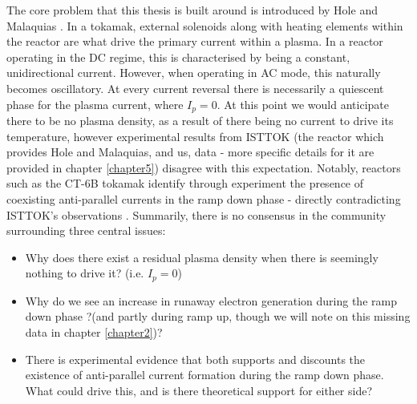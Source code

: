 The core problem that this thesis is built around is introduced by Hole and Malaquias \cite{malaquias-matthew}.
In a tokamak, external solenoids along with heating elements within the reactor are 
what drive the primary current within a plasma. In a reactor operating in the DC regime, this is 
characterised by being a constant, unidirectional current. However, when operating in AC mode, 
this naturally becomes oscillatory. At every current reversal there is necessarily a quiescent phase 
for the plasma current, where $I_{p} = 0$. At this point we would anticipate there to be no plasma density,
as a result of there being no current to drive its temperature, however experimental results from ISTTOK (the 
reactor which provides Hole and Malaquias, and us, data - more specific details for it are provided in chapter 
\ref{chapter5}) disagree with this expectation. 
Notably, reactors such as the CT-6B tokamak identify through experiment the presence of coexisting anti-parallel 
currents in the ramp down phase - directly contradicting ISTTOK's observations \cite{huang-ct-tokamak}. 
Summarily, there is no consensus in the community surrounding three central issues:
\begin{itemize}
    \item Why does there exist a residual plasma density when there is seemingly nothing to drive it? (i.e. $I_p = 0$)
    \item Why do we see an increase in runaway electron generation during the ramp down phase ?(and partly during 
    ramp up, though we will note on this missing data in chapter \ref{chapter2})?
    \item There is experimental evidence that both supports and discounts the existence of anti-parallel current
    formation during the ramp down phase. What could drive this, and is there theoretical support for either side?
\end{itemize}

